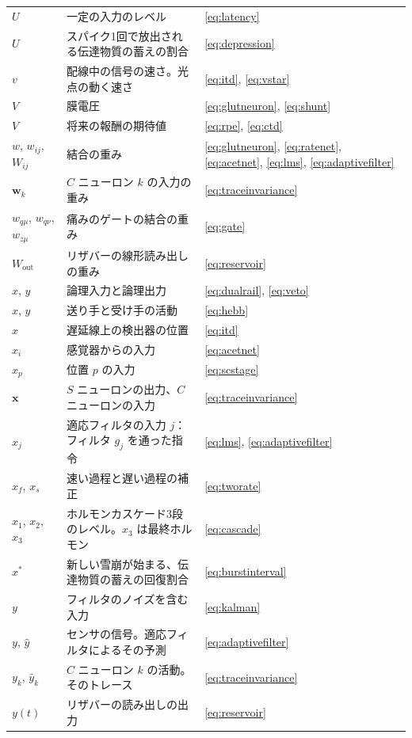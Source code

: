 \begin{center}
\begin{longtable}{>{\raggedright}p{2.0cm}>{\raggedright}p{9.6cm}>{\raggedright\arraybackslash}p{2.4cm}}
$U$ & 一定の入力のレベル & \eqref{eq:latency} \\
$U$ & スパイク1回で放出される伝達物質の蓄えの割合 & \eqref{eq:depression} \\
$v$ & 配線中の信号の速さ。光点の動く速さ & \eqref{eq:itd}, \eqref{eq:vstar} \\
$V$ & 膜電圧 & \eqref{eq:glutneuron}, \eqref{eq:shunt} \\
$V$ & 将来の報酬の期待値 & \eqref{eq:rpe}, \eqref{eq:ctd} \\
$w$, $w_{ij}$, $W_{ij}$ & 結合の重み & \eqref{eq:glutneuron}, \eqref{eq:ratenet}, \eqref{eq:acetnet}, \eqref{eq:lms}, \eqref{eq:adaptivefilter} \\
$\mathbf w_k$ & $C$ ニューロン $k$ の入力の重み & \eqref{eq:traceinvariance} \\
$w_{q\mu}$, $w_{q\nu}$, $w_{z\mu}$ & 痛みのゲートの結合の重み & \eqref{eq:gate} \\
$W_{\text{out}}$ & リザバーの線形読み出しの重み & \eqref{eq:reservoir} \\
$x$, $y$ & 論理入力と論理出力 & \eqref{eq:dualrail}, \eqref{eq:veto} \\
$x$, $y$ & 送り手と受け手の活動 & \eqref{eq:hebb} \\
$x$ & 遅延線上の検出器の位置 & \eqref{eq:itd} \\
$x_i$ & 感覚器からの入力 & \eqref{eq:acetnet} \\
$x_p$ & 位置 $p$ の入力 & \eqref{eq:scstage} \\
$\mathbf x$ & $S$ ニューロンの出力、$C$ ニューロンの入力 & \eqref{eq:traceinvariance} \\
$x_j$ & 適応フィルタの入力 $j$：フィルタ $g_j$ を通った指令 & \eqref{eq:lms}, \eqref{eq:adaptivefilter} \\
$x_f$, $x_s$ & 速い過程と遅い過程の補正 & \eqref{eq:tworate} \\
$x_1$, $x_2$, $x_3$ & ホルモンカスケード3段のレベル。$x_3$ は最終ホルモン & \eqref{eq:cascade} \\
$x^*$ & 新しい雪崩が始まる、伝達物質の蓄えの回復割合 & \eqref{eq:burstinterval} \\
$y$ & フィルタのノイズを含む入力 & \eqref{eq:kalman} \\
$y$, $\hat y$ & センサの信号。適応フィルタによるその予測 & \eqref{eq:adaptivefilter} \\
$y_k$, $\bar y_k$ & $C$ ニューロン $k$ の活動。そのトレース & \eqref{eq:traceinvariance} \\
$y(t)$ & リザバーの読み出しの出力 & \eqref{eq:reservoir} \\

\end{longtable}
\end{center}

